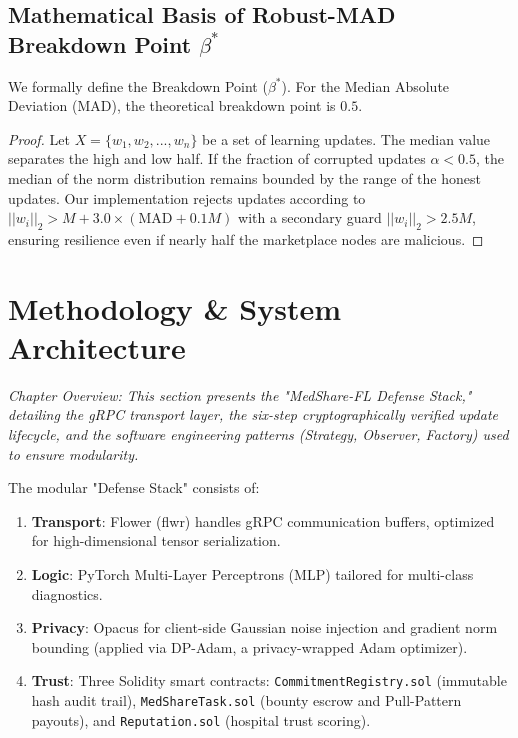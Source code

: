 \documentclass[10pt, a4paper, twocolumn]{article}
\begin{document}
\subsection{Mathematical Basis of Robust-MAD Breakdown Point \texorpdfstring{$\beta^*$}{beta*}}
We formally define the Breakdown Point ($\beta^*$). For the Median Absolute Deviation (MAD), the theoretical breakdown point is $0.5$.
\begin{proof}
Let $X = \{w_1, w_2, ..., w_n\}$ be a set of learning updates. The median value separates the high and low half. If the fraction of corrupted updates $\alpha < 0.5$, the median of the norm distribution remains bounded by the range of the honest updates. Our implementation rejects updates according to $||w_i||_2 > M + 3.0 \times (\text{MAD} + 0.1M)$ with a secondary guard $||w_i||_2 > 2.5M$, ensuring resilience even if nearly half the marketplace nodes are malicious.
\end{proof}

\section{Methodology \& System Architecture}

\textit{Chapter Overview: This section presents the "MedShare-FL Defense Stack," detailing the gRPC transport layer, the six-step cryptographically verified update lifecycle, and the software engineering patterns (Strategy, Observer, Factory) used to ensure modularity.}

The modular "Defense Stack" consists of:
\begin{enumerate}
    \item \textbf{Transport}: Flower (flwr) \cite{beutel2022} handles gRPC communication buffers, optimized for high-dimensional tensor serialization.
    \item \textbf{Logic}: PyTorch Multi-Layer Perceptrons (MLP) tailored for multi-class diagnostics.
    \item \textbf{Privacy}: Opacus for client-side Gaussian noise injection and gradient norm bounding (applied via DP-Adam, a privacy-wrapped Adam optimizer).
    \item \textbf{Trust}: Three Solidity smart contracts: \texttt{CommitmentRegistry.sol} (immutable hash audit trail), \texttt{MedShareTask.sol} (bounty escrow and Pull-Pattern payouts), and \texttt{Reputation.sol} (hospital trust scoring).
\end{enumerate}
\end{document}
